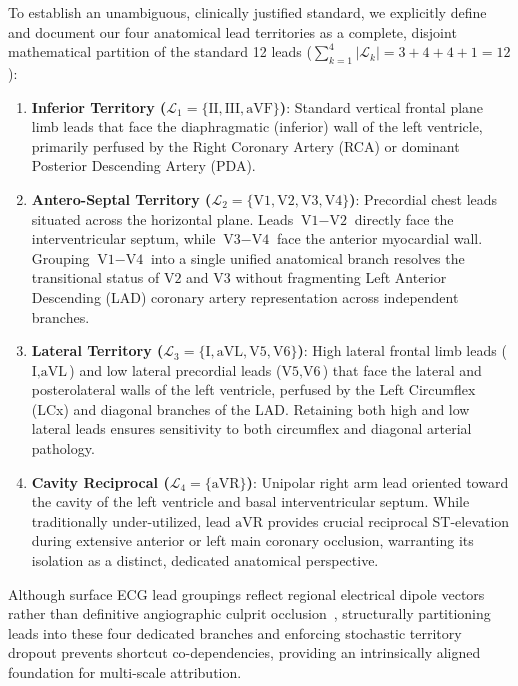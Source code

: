 \documentclass[12pt]{elsarticle}
\begin{document}
To establish an unambiguous, clinically justified standard, we explicitly define and document our four anatomical lead territories as a complete, disjoint mathematical partition of the standard 12 leads ($\sum_{k=1}^4 |\mathcal{L}_k| = 3 + 4 + 4 + 1 = 12$):
\begin{enumerate}
    \item \textbf{Inferior Territory ($\mathcal{L}_1 = \{\text{II}, \text{III}, \text{aVF}\}$)}: Standard vertical frontal plane limb leads that face the diaphragmatic (inferior) wall of the left ventricle, primarily perfused by the Right Coronary Artery (RCA) or dominant Posterior Descending Artery (PDA).
    \item \textbf{Antero-Septal Territory ($\mathcal{L}_2 = \{\text{V1}, \text{V2}, \text{V3}, \text{V4}\}$)}: Precordial chest leads situated across the horizontal plane. Leads $\text{V1}-\text{V2}$ directly face the interventricular septum, while $\text{V3}-\text{V4}$ face the anterior myocardial wall. Grouping $\text{V1}-\text{V4}$ into a single unified anatomical branch resolves the transitional status of $\text{V2}$ and $\text{V3}$ without fragmenting Left Anterior Descending (LAD) coronary artery representation across independent branches.
    \item \textbf{Lateral Territory ($\mathcal{L}_3 = \{\text{I}, \text{aVL}, \text{V5}, \text{V6}\}$)}: High lateral frontal limb leads ($\text{I}, \text{aVL}$) and low lateral precordial leads ($\text{V5}, \text{V6}$) that face the lateral and posterolateral walls of the left ventricle, perfused by the Left Circumflex (LCx) and diagonal branches of the LAD. Retaining both high and low lateral leads ensures sensitivity to both circumflex and diagonal arterial pathology.
    \item \textbf{Cavity Reciprocal ($\mathcal{L}_4 = \{\text{aVR}\}$)}: Unipolar right arm lead oriented toward the cavity of the left ventricle and basal interventricular septum. While traditionally under-utilized, lead $\text{aVR}$ provides crucial reciprocal ST-elevation during extensive anterior or left main coronary occlusion, warranting its isolation as a distinct, dedicated anatomical perspective.
\end{enumerate}
Although surface ECG lead groupings reflect regional electrical dipole vectors rather than definitive angiographic culprit occlusion~\cite{wagner2009aha}, structurally partitioning leads into these four dedicated branches and enforcing stochastic territory dropout prevents shortcut co-dependencies, providing an intrinsically aligned foundation for multi-scale attribution.
\end{document}
